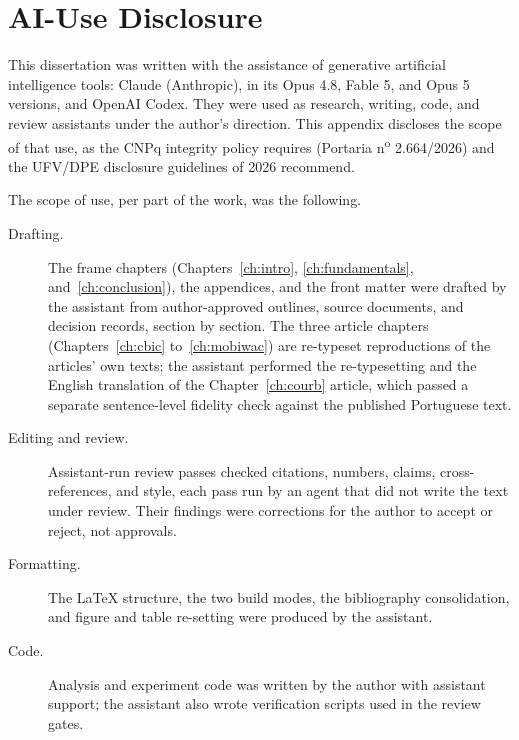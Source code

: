 
\chapter{AI-Use Disclosure}
\label{apx:ai}

This dissertation was written with the assistance of generative artificial
intelligence tools: Claude (Anthropic), in its Opus 4.8, Fable 5, and Opus 5 versions,
and OpenAI Codex. They were used as research, writing, code, and review assistants under
the author's direction. This appendix
discloses the scope of that use, as the CNPq integrity policy requires (Portaria
n\textsuperscript{o} 2.664/2026) and the UFV/DPE disclosure guidelines of 2026 recommend.

The scope of use, per part of the work, was the following.

\begin{description}
  \item[Drafting.] The frame chapters (Chapters~\ref{ch:intro}, \ref{ch:fundamentals},
        and~\ref{ch:conclusion}), the appendices, and the front matter were drafted by
        the assistant from author-approved outlines, source documents, and decision
        records, section by section. The three article chapters
        (Chapters~\ref{ch:cbic} to~\ref{ch:mobiwac}) are re-typeset reproductions of
        the articles' own texts; the assistant performed the re-typesetting and the
        English translation of the Chapter~\ref{ch:courb} article, which passed a
        separate sentence-level fidelity check against the published Portuguese text.
  \item[Editing and review.] Assistant-run review passes checked citations, numbers,
        claims, cross-references, and style, each pass run by an agent that did not
        write the text under review. Their findings were corrections for the author to
        accept or reject, not approvals.
  \item[Formatting.] The LaTeX structure, the two build modes, the bibliography
        consolidation, and figure and table re-setting were produced by the assistant.
  \item[Code.] Analysis and experiment code was written by the author with assistant
        support; the assistant also wrote verification scripts used in the review
        gates.
\end{description}

